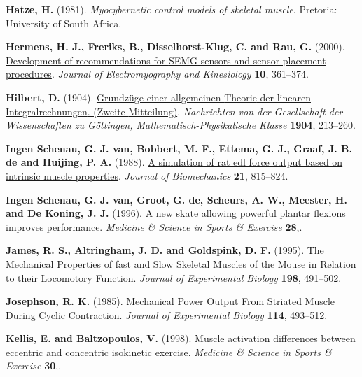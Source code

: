 \documentclass[
  11pt,
  a4paper]{article}
\newlength{\cslhangindent}
\newenvironment{CSLReferences}[2] %
 {\begin{list}{}{%
  \setlength{\itemindent}{0pt}
  \setlength{\leftmargin}{0pt}
  \setlength{\parsep}{0pt}
  \ifodd #1
   \setlength{\leftmargin}{\cslhangindent}
   \setlength{\itemindent}{-1\cslhangindent}
  \fi
  \setlength{\itemsep}{#2\baselineskip}}}
 {\end{list}}
\begin{document}
\begin{CSLReferences}{1}{1}
\textbf{Hatze, H.} (1981). \emph{Myocybernetic control models of
skeletal muscle}. Pretoria: University of South Africa.

\textbf{Hermens, H. J., Freriks, B., Disselhorst-Klug, C. and Rau, G.}
(2000). \href{https://doi.org/10.1016/S1050-6411(00)00027-4}{Development
of recommendations for {SEMG} sensors and sensor placement procedures}.
\emph{Journal of Electromyography and Kinesiology} \textbf{10},
361--374.

\textbf{Hilbert, D.} (1904). \href{http://eudml.org/doc/58582}{Grundzüge
einer allgemeinen {Theorie} der linearen {Integralrechnungen}. ({Zweite}
{Mitteilung})}. \emph{Nachrichten von der Gesellschaft der
Wissenschaften zu Göttingen, Mathematisch-Physikalische Klasse}
\textbf{1904}, 213--260.

\textbf{Ingen Schenau, G. J. van, Bobbert, M. F., Ettema, G. J., Graaf,
J. B. de and Huijing, P. A.} (1988).
\href{https://doi.org/10.1016/0021-9290(88)90014-0}{A simulation of rat
edl force output based on intrinsic muscle properties}. \emph{Journal of
Biomechanics} \textbf{21}, 815--824.

\textbf{Ingen Schenau, G. J. van, Groot, G. de, Scheurs, A. W., Meester,
H. and De Koning, J. J.} (1996).
\href{https://journals.lww.com/acsm-msse/fulltext/1996/04000/a_new_skate_allowing_powerful_plantar_flexions.20.aspx}{A
new skate allowing powerful plantar flexions improves performance}.
\emph{Medicine \& Science in Sports \& Exercise} \textbf{28},.

\textbf{James, R. S., Altringham, J. D. and Goldspink, D. F.} (1995).
\href{https://doi.org/10.1242/jeb.198.2.491}{The {Mechanical}
{Properties} of fast and {Slow} {Skeletal} {Muscles} of the {Mouse} in
{Relation} to their {Locomotory} {Function}}. \emph{Journal of
Experimental Biology} \textbf{198}, 491--502.

\textbf{Josephson, R. K.} (1985).
\href{https://doi.org/10.1242/jeb.114.1.493}{Mechanical {Power} {Output}
{From} {Striated} {Muscle} {During} {Cyclic} {Contraction}}.
\emph{Journal of Experimental Biology} \textbf{114}, 493--512.

\textbf{Kellis, E. and Baltzopoulos, V.} (1998).
\href{https://journals.lww.com/acsm-msse/fulltext/1998/11000/muscle_activation_differences_between_eccentric.10.aspx}{Muscle
activation differences between eccentric and concentric isokinetic
exercise}. \emph{Medicine \& Science in Sports \& Exercise}
\textbf{30},.


\end{CSLReferences}
\end{document}
